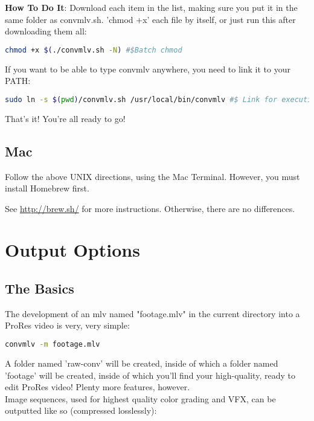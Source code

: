 \documentclass[a4paper,12pt]{article}
\begin{document}
		\textbf{How To Do It}: Download each item in the list, making sure you put it in the same folder as convmlv.sh. 'chmod +x' each
		file by itself, or just run this after downloading them all:
		
\begin{lstlisting}[language=bash]
	chmod +x $(./convmlv.sh -N) #$Batch chmod
\end{lstlisting}
		
		If you want to be able to type convmlv anywhere, you need to link it to your PATH:
		
\begin{lstlisting}[language=bash]
	sudo ln -s $(pwd)/convmlv.sh /usr/local/bin/convmlv #$ Link for execution.
\end{lstlisting}
		
		That's it! You're all ready to go!
		
	\subsection{Mac}
	
		Follow the above UNIX directions, using the Mac Terminal. However, you must install Homebrew first.
		
		See \url{http://brew.sh/} for more instructions. Otherwise, there are no differences.

\section{Output Options}
	
	\subsection{The Basics}
		
		The development of an mlv named "footage.mlv" in the current directory into a ProRes video is very, very simple:
		
\begin{lstlisting}[language=bash]
	convmlv -m footage.mlv
\end{lstlisting}
		
		A folder named 'raw-conv' will be created, inside of which a folder named 'footage' will be created, inside of which you'll find your
		high-quality, ready to edit ProRes video! Plenty more features, however.\\
		
		Image sequences, used for highest quality color grading and VFX, can be outputted like so (compressed losslessly):
		
\end{document}
